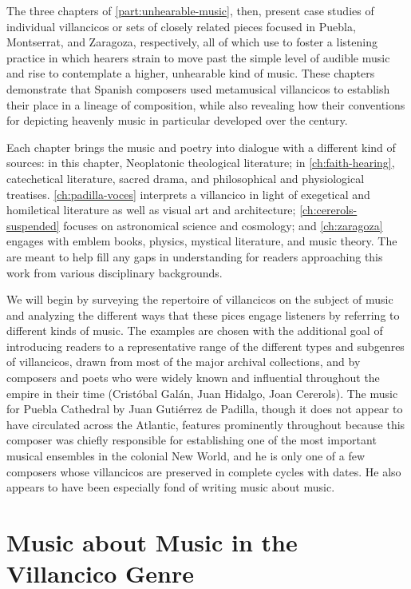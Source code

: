 The three chapters of \cref{part:unhearable-music}, then, present case studies
of individual villancicos or sets of closely related pieces focused in Puebla,
Montserrat, and Zaragoza, respectively, all of which use  to foster a listening practice in which hearers strain to move past the
simple level of audible music and rise to contemplate a higher, unhearable kind
of music.
These chapters demonstrate that Spanish composers used metamusical villancicos
to establish their place in a lineage of composition, while also revealing how
their conventions for depicting heavenly music in particular developed over the
century.

Each chapter brings the music and poetry into dialogue with a different kind of
sources: in this chapter, Neoplatonic theological literature; in
\cref{ch:faith-hearing}, catechetical literature, sacred drama, and
philosophical and physiological treatises.
\cref{ch:padilla-voces} interprets a villancico in light of exegetical and
homiletical literature as well as visual art and architecture;
\cref{ch:cererols-suspended} focuses on astronomical science and cosmology; and
\cref{ch:zaragoza} engages with emblem books, physics, mystical literature, and
music theory.
The  are meant to help fill any gaps
in understanding for readers approaching this work from various disciplinary
backgrounds.

We will begin by surveying the repertoire of villancicos on the subject of
music and analyzing the different ways that these pices engage listeners by
referring to different kinds of music.
The examples are chosen with the additional goal of introducing readers to a
representative range of the different types and subgenres of villancicos, drawn
from most of the major archival collections, and by composers and poets who
were widely known and influential throughout the empire in their time
(Cristóbal Galán, Juan Hidalgo, Joan Cererols).
The music for Puebla Cathedral by Juan Gutiérrez de Padilla, though it does not
appear to have circulated across the Atlantic, features prominently throughout
because this composer was chiefly responsible for establishing one of the most
important musical ensembles in the colonial New World, and he is only
one of a few composers whose villancicos are preserved in complete cycles with
dates.
He also appears to have been especially fond of writing music about music.

\section{Music about Music in the Villancico Genre}

